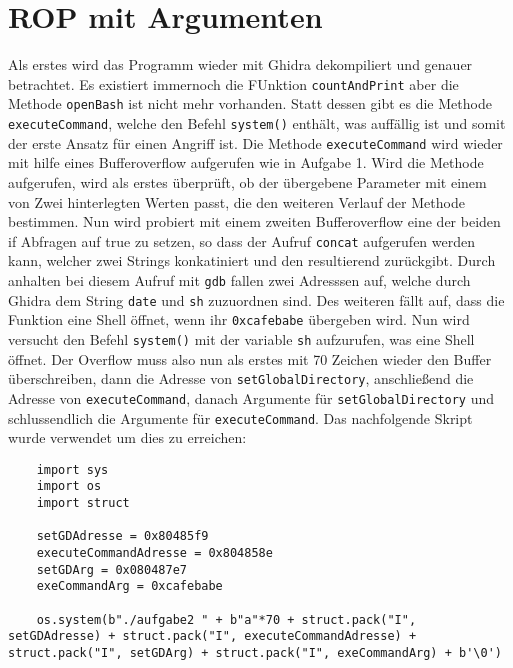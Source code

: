 \documentclass[a4paper,12pt,
headsepline,           %
oneside,               %
pointlessnumbers,      %
bibtotoc,              %
BCOR15mm               %
]{scrbook}
\begin{document}
\section*{ROP mit Argumenten}
Als erstes wird das Programm wieder mit Ghidra dekompiliert und genauer betrachtet. Es existiert immernoch die FUnktion \texttt{countAndPrint} aber die Methode \texttt{openBash} ist nicht mehr vorhanden. Statt dessen gibt es die Methode \texttt{executeCommand}, welche den Befehl \texttt{system()} enthält, was auffällig ist und somit der erste Ansatz für einen Angriff ist. Die Methode \texttt{executeCommand} wird wieder mit hilfe eines Bufferoverflow aufgerufen wie in Aufgabe 1. 
Wird die Methode aufgerufen, wird als erstes überprüft, ob der übergebene Parameter mit einem von Zwei hinterlegten Werten passt, die den weiteren Verlauf der Methode bestimmen. Nun wird probiert mit einem zweiten Bufferoverflow eine der beiden if Abfragen auf true zu setzen, so dass der Aufruf \texttt{concat} aufgerufen werden kann, welcher zwei Strings konkatiniert und den resultierend zurückgibt. Durch anhalten bei diesem Aufruf mit \texttt{gdb} fallen zwei Adresssen auf, welche durch Ghidra dem String \texttt{date} und \texttt{sh} zuzuordnen sind. Des weiteren fällt auf, dass die Funktion eine Shell öffnet, wenn ihr \texttt{0xcafebabe} übergeben wird. Nun wird versucht den Befehl \texttt{system()} mit der variable \texttt{sh} aufzurufen, was eine Shell öffnet. Der Overflow muss also nun als erstes mit 70 Zeichen wieder den Buffer überschreiben, dann die Adresse von \texttt{setGlobalDirectory}, anschließend die Adresse von \texttt{executeCommand}, danach Argumente für \texttt{setGlobalDirectory} und schlussendlich die Argumente für \texttt{executeCommand}. Das nachfolgende Skript wurde verwendet um dies zu erreichen:

\begin{lstlisting}
    import sys
    import os
    import struct

    setGDAdresse = 0x80485f9
    executeCommandAdresse = 0x804858e
    setGDArg = 0x080487e7
    exeCommandArg = 0xcafebabe

    os.system(b"./aufgabe2 " + b"a"*70 + struct.pack("I", setGDAdresse) + struct.pack("I", executeCommandAdresse) + struct.pack("I", setGDArg) + struct.pack("I", exeCommandArg) + b'\0')
\end{lstlisting}
\end{document}
